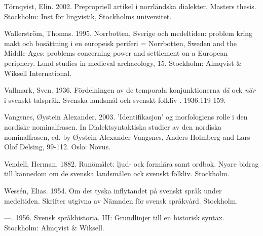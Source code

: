 \begin{styleBodytextC}
Törnqvist, Elin. 2002. Prepropriell artikel i norrländska dialekter. Masters thesis. Stockholm: Inst för lingvistik, Stockholms universitet.

\end{styleBodytextC}

\begin{styleBodytextC}
Wallerström, Thomas. 1995. Norrbotten, Sverige och medeltiden: problem kring makt och bosättning i en europeisk periferi = Norrbotten, Sweden and the Middle Ages: problems concerning power and settlement on a European periphery. Lund studies in medieval archaeology, 15. Stockholm: Almqvist \& Wiksell International.

\end{styleBodytextC}

\begin{styleBodytextC}
Vallmark, Sven. 1936. Fördelningen av de temporala konjunktionerna \textit{då} ock \textit{när} i svenskt talspråk. Svenska landsmål och svenskt folkliv . 1936.119-159.

\end{styleBodytextC}

\begin{styleBodytextC}
Vangsnes, Øystein Alexander. 2003. 'Identifikasjon' og morfologiens rolle i den nordiske nominalfrasen. In Dialektsyntaktiska studier av den nordiska nominalfrasen, ed. by Øystein Alexander Vangsnes, Anders Holmberg and Lars-Olof Delsing, 99-112. Oslo: Novus.

\end{styleBodytextC}

\begin{styleBodytextC}
Vendell, Herman. 1882. Runömålet: ljud- ock formlära samt ordbok. Nyare bidrag till kännedom om de svenska landsmålen ock svenskt folkliv. Stockholm.

\end{styleBodytextC}

\begin{styleBodytextC}
Wessén, Elias. 1954. Om det tyska inflytandet på svenskt språk under medeltiden. Skrifter utgivna av Nämnden för svensk språkvård. Stockholm.

\end{styleBodytextC}

\begin{styleBodytextC}
—. 1956. Svensk språkhistoria. III: Grundlinjer till en historisk syntax. Stockholm: Almqvist \& Wiksell.

\end{styleBodytextC}

